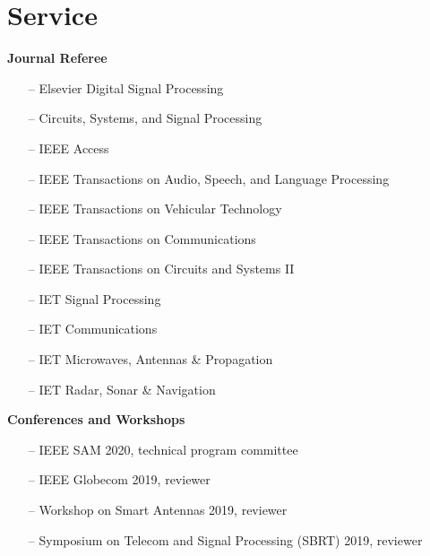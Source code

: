 \section{Service} 

{\bf Journal Referee}\\
\begin{itemize}
	\item[--] Elsevier Digital Signal Processing
	\item[--] Circuits, Systems, and Signal Processing
	\item[--] IEEE Access
	\item[--] IEEE Transactions on Audio, Speech, and Language Processing
	\item[--] IEEE Transactions on Vehicular Technology
	\item[--] IEEE Transactions on Communications
	\item[--] IEEE Transactions on Circuits and Systems II
	\item[--] IET Signal Processing
	\item[--] IET Communications
	\item[--] IET Microwaves, Antennas \& Propagation
	\item[--] IET Radar, Sonar \& Navigation
\end{itemize}

{\bf Conferences and Workshops}\\
\begin{itemize}
	\item[--] IEEE SAM 2020, technical program committee
	\item[--] IEEE Globecom 2019, reviewer
	\item[--] Workshop on Smart Antennas 2019, reviewer
	\item[--] Symposium on Telecom and Signal Processing (SBRT) 2019, reviewer
\end{itemize}